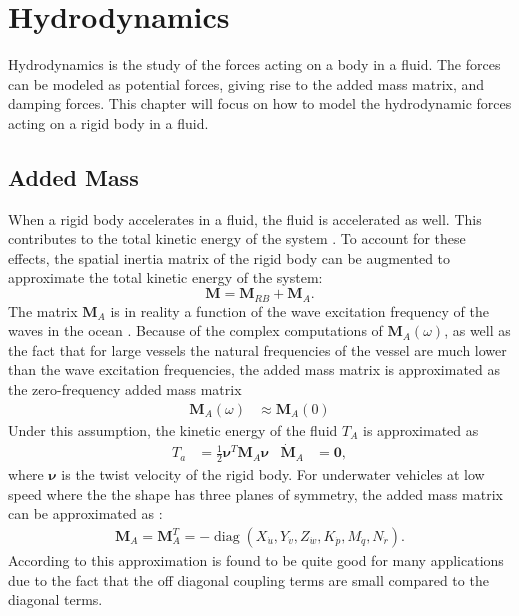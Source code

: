 \section{Hydrodynamics}
\label{sec:hydrodynamics}

Hydrodynamics is the study of the forces acting on a body in a fluid. The forces
can be modeled as potential forces, giving rise to the added mass matrix, and
damping forces. This chapter will focus on how to model the hydrodynamic forces
acting on a rigid body in a fluid.

\subsection{Added Mass}

When a rigid body accelerates in a fluid, the fluid is accelerated as well. 
This contributes to the total kinetic energy of the system \cite{antonelli2018}.
To account for these effects, the spatial inertia matrix of the rigid body
can be augmented to approximate the total kinetic energy of the system: 
\begin{equation}
    \bm{M} = \bm{M}_{RB} + \bm{M}_{A}.
\end{equation}
The matrix $\bm{M}_A$ is in reality a function of the wave excitation frequency
of the waves in the ocean \cite{fossen2021}. Because of the complex computations
of $\bm{M}_A(\omega)$, as well as the fact that for large vessels the natural
frequencies of the vessel are much lower than the wave excitation frequencies,
the added mass matrix is approximated as the zero-frequency added mass matrix
\begin{align}
    \bm{M}_A(\omega) &\approx \bm{M}_A(0)
\end{align}
Under this assumption, the kinetic energy of the fluid $T_A$ is approximated
as
\begin{align}
    T_a &= \frac{1}{2}\bm{\nu}^T\bm{M}_A\bm{\nu} & \dot{\bm{M}}_A &= \bm{0},
\end{align}
where $\bm{\nu}$ is the twist velocity of the rigid body. For underwater 
vehicles at low speed where the the shape has three planes of symmetry, the
added mass matrix can be approximated as \cite{fossen2021}:
\begin{align}
    \bm{M}_A = \bm{M}_A^T =
    -\operatorname{diag}(X_{\dot{u}}, Y_{\dot{v}}, Z_{\dot{w}},
        K_{\dot{p}}, M_{\dot{q}}, N_{\dot{r}}).
\end{align}
According to \cite{fossen2021} this approximation is found to be quite good for
many applications due to the fact that the off diagonal coupling terms are small
compared to the diagonal terms.


